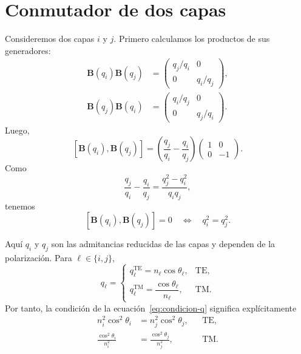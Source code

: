 \documentclass[10pt,a4paper]{article}
\newcommand{\B}{\mathbf{B}}
\newcommand{\comm}[2]{\left[#1,#2\right]}
\begin{document}
\section{Conmutador de dos capas}

Consideremos dos capas $i$ y $j$. Primero calculamos los productos de sus generadores:
\begin{align}
\B(q_i)\B(q_j)
&=
\begin{pmatrix}
q_j/q_i&0\\
0&q_i/q_j
\end{pmatrix},\\[3pt]
\B(q_j)\B(q_i)
&=
\begin{pmatrix}
q_i/q_j&0\\
0&q_j/q_i
\end{pmatrix}.
\end{align}
Luego,
\begin{equation}
\comm{\B(q_i)}{\B(q_j)}
=
\left(\frac{q_j}{q_i}-\frac{q_i}{q_j}\right)
\begin{pmatrix}1&0\\0&-1\end{pmatrix}.
\label{eq:conmutador-B}
\end{equation}
Como
\begin{equation}
\frac{q_j}{q_i}-\frac{q_i}{q_j}
=\frac{q_j^2-q_i^2}{q_iq_j},
\end{equation}
tenemos
\begin{equation}
\comm{\B(q_i)}{\B(q_j)}=0
\quad\Longleftrightarrow\quad
q_i^2=q_j^2.
\label{eq:condicion-q}
\end{equation}

Aqu\'i $q_i$ y $q_j$ son las admitancias reducidas de las capas y dependen de la polarizaci\'on. Para $\ell\in\{i,j\}$,
\begin{equation*}
q_\ell=
\begin{cases}
q_\ell^{\mathrm{TE}}=n_\ell\cos\theta_\ell,
&\mathrm{TE},\\[2pt]
q_\ell^{\mathrm{TM}}=\dfrac{\cos\theta_\ell}{n_\ell},
&\mathrm{TM}.
\end{cases}
\end{equation*}
Por tanto, la condici\'on de la ecuaci\'on~\eqref{eq:condicion-q} significa expl\'icitamente
\begin{equation*}
\begin{aligned}
n_i^2\cos^2\theta_i&=n_j^2\cos^2\theta_j,
&&\mathrm{TE},\\
\frac{\cos^2\theta_i}{n_i^2}
&=\frac{\cos^2\theta_j}{n_j^2},
&&\mathrm{TM}.
\end{aligned}
\end{equation*}
\end{document}
